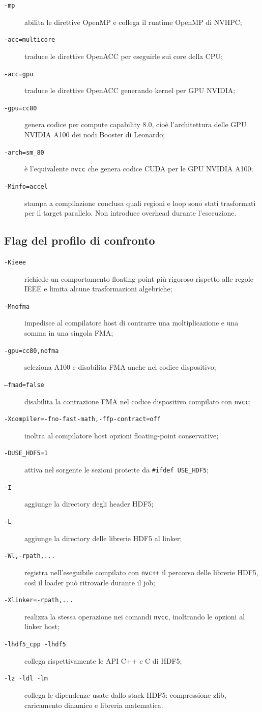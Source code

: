\documentclass[11pt,a4paper]{article}
\begin{document}
\begin{description}
  \item[\texttt{-mp}] abilita le direttive OpenMP e collega il runtime OpenMP
  di NVHPC;
  \item[\texttt{-acc=multicore}] traduce le direttive OpenACC per eseguirle sui
  core della CPU;
  \item[\texttt{-acc=gpu}] traduce le direttive OpenACC generando kernel per
  GPU NVIDIA;
  \item[\texttt{-gpu=cc80}] genera codice per compute capability 8.0, cioè
  l'architettura delle GPU NVIDIA A100 dei nodi Booster di Leonardo;
  \item[\texttt{-arch=sm\_80}] è l'equivalente \texttt{nvcc} che genera
  codice CUDA per le GPU NVIDIA A100;
  \item[\texttt{-Minfo=accel}] stampa a compilazione conclusa quali regioni e
  loop sono stati trasformati per il target parallelo. Non introduce overhead
  durante l'esecuzione.
\end{description}

\subsection{Flag del profilo di confronto}

\begin{description}
  \item[\texttt{-Kieee}] richiede un comportamento floating-point più rigoroso
  rispetto alle regole IEEE e limita alcune trasformazioni algebriche;
  \item[\texttt{-Mnofma}] impedisce al compilatore host di contrarre una
  moltiplicazione e una somma in una singola FMA;
  \item[\texttt{-gpu=cc80,nofma}] seleziona A100 e disabilita FMA anche nel
  codice dispositivo;
  \item[\texttt{--fmad=false}] disabilita la contrazione FMA nel codice
  dispositivo compilato con \texttt{nvcc};
  \item[\texttt{-Xcompiler=-fno-fast-math,-ffp-contract=off}] inoltra al
  compilatore host opzioni floating-point conservative;
  \item[\texttt{-DUSE\_HDF5=1}] attiva nel sorgente le sezioni protette da
  \texttt{\#ifdef USE\_HDF5};
  \item[\texttt{-I}] aggiunge la directory degli header HDF5;
  \item[\texttt{-L}] aggiunge la directory delle librerie HDF5 al linker;
  \item[\texttt{-Wl,-rpath,...}] registra nell'eseguibile compilato con
  \texttt{nvc++} il percorso delle librerie HDF5, così il loader può
  ritrovarle durante il job;
  \item[\texttt{-Xlinker=-rpath,...}] realizza la stessa operazione nei
  comandi \texttt{nvcc}, inoltrando le opzioni al linker host;
  \item[\texttt{-lhdf5\_cpp -lhdf5}] collega rispettivamente le API C++ e C di
  HDF5;
  \item[\texttt{-lz -ldl -lm}] collega le dipendenze usate dallo stack HDF5:
  compressione zlib, caricamento dinamico e libreria matematica.
\end{description}
\end{document}
